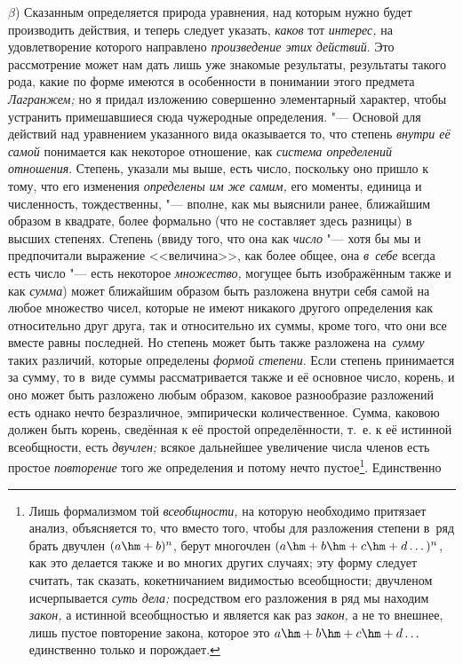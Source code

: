 $\beta$) Сказанным определяется природа уравнения, над которым нужно будет
производить действия, и теперь следует указать, {\em каков} тот {\em интерес,}
на удовлетворение которого направлено {\em произведение этих действий}. Это
рассмотрение может нам дать лишь уже знакомые результаты, результаты такого
рода, какие по форме имеются в особенности в понимании этого предмета
{\em Лагранжем;} но я придал изложению совершенно элементарный характер, чтобы
устранить примешавшиеся сюда чужеродные определения. "--- Основой для действий
над уравнением указанного вида оказывается то, что степень
{\em внутри её самой} понимается как некоторое отношение, как
{\em система определений отношения}. Степень, указали мы выше, есть число,
поскольку оно пришло к тому, что его изменения {\em определены им же самим,}
его моменты, единица и численность, тождественны, "--- вполне, как мы выяснили
ранее, ближайшим образом в квадрате, более формально (что не составляет здесь
разницы) в высших степенях. Степень (ввиду того, что она как {\em число} "---
хотя бы мы и предпочитали выражение <<величина>>, как более общее, она
{\em в~себе} всегда есть число "--- есть некоторое {\em множество,} могущее
быть изображённым также и как {\em сумма}) может ближайшим образом быть
разложена внутри себя самой на любое множество чисел, которые не имеют никакого
другого определения как относительно друг друга, так и относительно их суммы,
кроме того, что они все вместе равны последней. Но степень может быть также
разложена на~{\em сумму} таких различий, которые определены
{\em формой степени}. Если степень принимается за сумму, то в~виде суммы
рассматривается также и её основное число, корень, и оно может быть разложено
любым образом, каковое разнообразие разложений есть однако нечто безразличное,
эмпирически количественное. Сумма, каковою должен быть корень, сведённая к её
простой определённости, т.~е. к её истинной всеобщности, есть {\em двучлен;}
всякое дальнейшее увеличение числа членов есть простое {\em повторение} того же
определения и потому нечто пустое\footnote{Лишь формализмом той
{\em всеобщности,} на которую необходимо притязает анализ, объясняется то, что
вместо того, чтобы для разложения степени в~ряд брать двучлен $(a\hm+b)^n$,
берут многочлен $(a\hm+b\hm+c\hm+d\dots)^n$, как это делается также и во многих
других случаях; эту форму следует считать, так сказать, кокетничанием
видимостью всеобщности; двучленом исчерпывается {\em суть дела;} посредством
его разложения в ряд мы находим {\em закон,} а истинной всеобщностью и является
как раз {\em закон,} а не то внешнее, лишь пустое повторение закона, которое
это $a\hm+b\hm+c\hm+d\dots$ единственно только и порождает.}. Единственно
